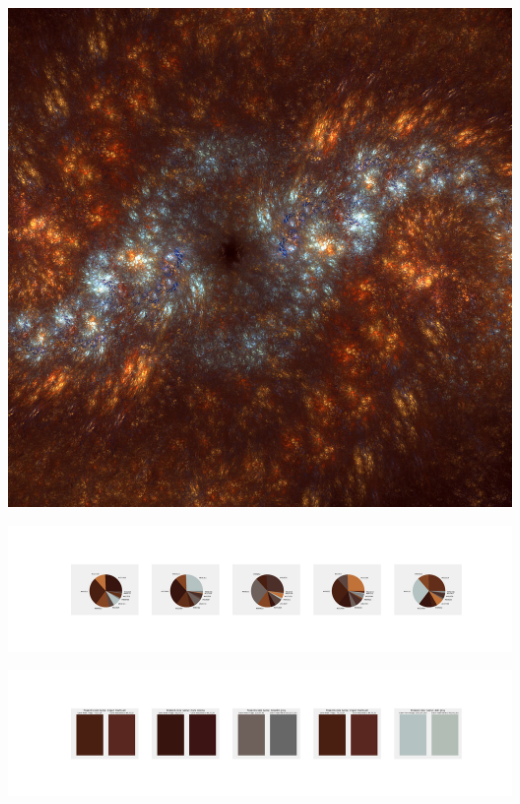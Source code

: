 \documentclass[11pt]{article}
\begin{document}
\begin{landscape}
    \begin{center}
    \includegraphics[width=\textwidth]{./nbimg/file (243).jpg}
    \end{center}

    \begin{center}
    \includegraphics[width=250mm]{./nbimg/pie-160.jpg}
    \end{center}

    \begin{center}
    \includegraphics[width=250mm]{./nbimg/peak-160.jpg}
    \end{center}
    


\end{landscape}
\end{document}
